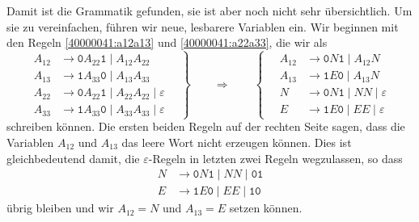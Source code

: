\begin{loesung}
Damit ist die Grammatik gefunden, sie ist aber noch nicht sehr übersichtlich.
Um sie zu vereinfachen, führen wir neue, lesbarere Variablen ein.
Wir beginnen mit den Regeln \eqref{40000041:a12a13} und \eqref{40000041:a22a33},
die wir als
\[
\left.
\begin{aligned}
A_{12}&\to\texttt{0} A_{22}\texttt{1} \mid  A_{12}A_{22}\\
A_{13}&\to\texttt{1} A_{33}\texttt{0} \mid  A_{13}A_{33}\\
A_{22}&\to \texttt{0}A_{22}\texttt{1} \mid  A_{22}A_{22} \mid  \varepsilon\\
A_{33}&\to \texttt{1}A_{33}\texttt{0} \mid  A_{33}A_{33} \mid  \varepsilon
\end{aligned}
\quad
\right\}
\qquad\Rightarrow\qquad
\left\{
\quad
\begin{aligned}
A_{12}&\to\texttt{0} N\texttt{1} \mid  A_{12}N \\
A_{13}&\to\texttt{1} E\texttt{0} \mid  A_{13}N \\
N &\to \texttt{0} N \texttt{1} \mid  NN \mid  \varepsilon\\
E &\to \texttt{1} E \texttt{0} \mid  EE \mid  \varepsilon
\end{aligned}
\right.
\]
schreiben können.
Die ersten beiden Regeln auf der rechten Seite sagen, dass die Variablen
$A_{12}$ und $A_{13}$ das leere Wort nicht erzeugen können.
Dies ist gleichbedeutend damit, die $\varepsilon$-Regeln in letzten zwei 
Regeln wegzulassen, so dass 
\begin{equation}
\begin{aligned}
N &\to \texttt{0} N \texttt{1} \mid  NN \mid  \texttt{01}\\
E &\to \texttt{1} E \texttt{0} \mid  EE \mid  \texttt{10}
\end{aligned}
\label{40000041:NE}
\end{equation}
übrig bleiben und wir $A_{12}=N$ und $A_{13}=E$ setzen können.


\end{loesung}
